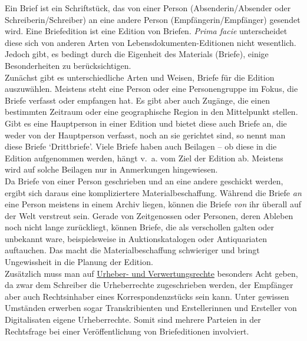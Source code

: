 \documentclass{article}
\begin{document}
    Ein Brief ist ein Schriftstück, das von einer Person (Absenderin/Absender oder
                  Schreiberin/Schreiber) an eine andere Person (Empfängerin/Empfänger) gesendet
                  wird. Eine Briefedition ist eine Edition von Briefen. \emph{Prima
                     facie} unterscheidet diese sich von anderen Arten von
                  Lebensdokumenten-Editionen nicht wesentlich. Jedoch gibt, es bedingt durch die
                  Eigenheit des Materials (Briefe), einige Besonderheiten zu berücksichtigen.\\
            
        Zunächst gibt es unterschiedliche Arten und Weisen, Briefe für die Edition
                  auszuwählen. Meistens steht eine Person oder eine Personengruppe im Fokus, die
                  Briefe verfasst oder empfangen hat. Es gibt aber auch Zugänge, die einen
                  bestimmten Zeitraum oder eine geographische Region in den Mittelpunkt stellen.
                  Gibt es eine Hauptperson in einer Edition und bietet diese auch Briefe an, die
                  weder von der Hauptperson verfasst, noch an sie gerichtet sind, so nennt man diese
                  Briefe ‘Drittbriefe’. Viele Briefe haben auch Beilagen – ob diese in die Edition
                  aufgenommen werden, hängt v. a. vom Ziel der Edition ab. Meistens wird auf solche
                  Beilagen nur in Anmerkungen hingewiesen.\\
            
        Da Briefe von einer Person geschrieben und an eine andere geschickt werden, ergibt
                  sich daraus eine kompliziertere Materialbeschaffung. Während die Briefe \emph{an} eine Person meistens in einem Archiv liegen, können die
                  Briefe \emph{von} ihr überall auf der Welt verstreut sein. Gerade
                  von Zeitgenossen oder Personen, deren Ableben noch nicht lange zurückliegt, können
                  Briefe, die als verschollen galten oder unbekannt ware, beispielsweise in
                  Auktionskatalogen oder Antiquariaten auftauchen. Das macht die Materialbeschaffung
                  schwieriger und bringt Ungewissheit in die Planung der Edition.\\
            
        Zusätzlich muss man auf \href{http://gams.uni-graz.at/o:konde.44}{Urheber- und
                     Verwertungsrechte} besonders Acht geben, da zwar dem Schreiber die
                  Urheberrechte zugeschrieben werden, der Empfänger aber auch Rechtsinhaber eines
                  Korrespondenzstücks sein kann. Unter gewissen Umständen erwerben sogar
                  Transkribienten und Erstellerinnen und Ersteller von Digitalisaten eigene
                  Urheberrechte. Somit sind mehrere Parteien in der Rechtsfrage bei einer
                  Veröffentlichung von Briefeditionen involviert.\\
            
\end{document}
